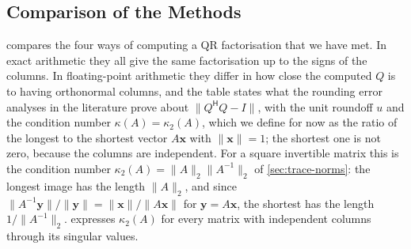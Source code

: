 \subsection{Comparison of the Methods}

 compares the four ways of computing a QR factorisation that we have met. In exact arithmetic they all give the same factorisation up to the signs of the columns. In floating-point arithmetic they differ in how close the computed $Q$ is to having orthonormal columns, and the table states what the rounding error analyses in the literature prove about $\|Q^{\mathsf H}Q-I\|$, with the unit roundoff $u$ and the condition number $\kappa(A)=\kappa_2(A)$, which we define for now as the ratio of the longest to the shortest vector $A\mathbf x$ with $\|\mathbf x\|=1$; the shortest one is not zero, because the columns are independent. For a square invertible matrix this is the condition number $\kappa_2(A)=\|A\|_2\|A^{-1}\|_2$ of \cref{sec:trace-norms}: the longest image has the length $\|A\|_2$, and since $\|A^{-1}\mathbf y\|/\|\mathbf y\|=\|\mathbf x\|/\|A\mathbf x\|$ for $\mathbf y=A\mathbf x$, the shortest has the length $1/\|A^{-1}\|_2$.  expresses $\kappa_2(A)$ for every matrix with independent columns through its singular values.

\begin{table}
\end{table}

